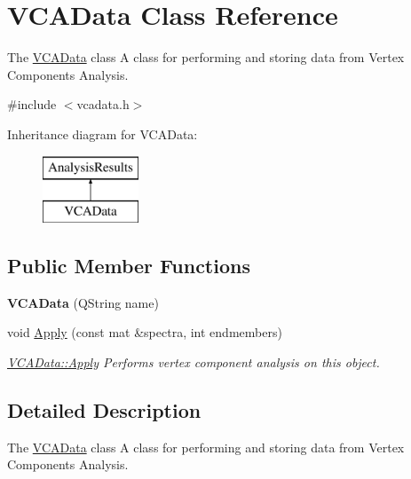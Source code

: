\hypertarget{class_v_c_a_data}{}\section{V\+C\+A\+Data Class Reference}
\label{class_v_c_a_data}


The \hyperlink{class_v_c_a_data}{V\+C\+A\+Data} class A class for performing and storing data from Vertex Components Analysis.  




{\ttfamily \#include $<$vcadata.\+h$>$}

Inheritance diagram for V\+C\+A\+Data\+:\begin{figure}[H]
\begin{center}
\leavevmode
\includegraphics[height=2.000000cm]{class_v_c_a_data}
\end{center}
\end{figure}
\subsection*{Public Member Functions}
\begin{DoxyCompactItemize}
\item 
{\bfseries V\+C\+A\+Data} (Q\+String name)\hypertarget{class_v_c_a_data_a6a66a69f0c53a6cdf8306e66e019bdd5}{}\label{class_v_c_a_data_a6a66a69f0c53a6cdf8306e66e019bdd5}

\item 
void \hyperlink{class_v_c_a_data_a4cce8c32e24fe85bb2db2cf7c57644ab}{Apply} (const mat \&spectra, int endmembers)
\begin{DoxyCompactList}\small\item\em \hyperlink{class_v_c_a_data_a4cce8c32e24fe85bb2db2cf7c57644ab}{V\+C\+A\+Data\+::\+Apply} Performs vertex component analysis on this object. \end{DoxyCompactList}\end{DoxyCompactItemize}


\subsection{Detailed Description}
The \hyperlink{class_v_c_a_data}{V\+C\+A\+Data} class A class for performing and storing data from Vertex Components Analysis. 

